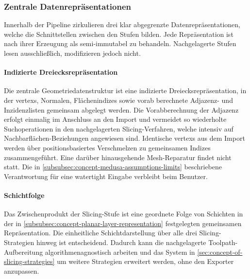            \subsubsection{Zentrale Datenrepräsentationen}\label{subsubsec:concept-medusa-data-representations} 
                Innerhalb der Pipeline zirkulieren drei klar abgegrenzte Datenrepräsentationen, welche die Schnittstellen zwischen den Stufen bilden.
                Jede Repräsentation ist nach ihrer Erzeugung als semi-immutabel zu behandeln.
                Nachgelagerte Stufen lesen ausschließlich, modifizieren jedoch nicht.

                \paragraph{Indizierte Dreiecksrepräsentation}
                    Die zentrale Geometriedatenstruktur ist eine indizierte Dreiecksrepräsentation, in der \glspl{vertex}, Normalen, Flächenindizes sowie vorab berechnete Adjazenz- und Inzidenzlisten gemeinsam abgelegt werden.
                    Die Vorabberechnung der Adjazenz erfolgt einmalig im Anschluss an den Import und vermeidet so wiederholte Suchoperationen in den nachgelagerten Slicing-Verfahren, welche intensiv auf Nachbarflächen-Beziehungen angewiesen sind.
                    Identische \glspl{vertex} aus dem Import werden über positionsbasiertes Verschmelzen zu gemeinsamen Indizes zusammengeführt.
                    Eine darüber hinausgehende Mesh-Reparatur findet nicht statt.
                    Die in \cref{subsubsec:concept-medusa-assumptions-limits} beschriebene Verantwortung für eine \gls{watertight} Eingabe verbleibt beim Benutzer.

                \paragraph{Schichtfolge}
                    Das Zwischenprodukt der Slicing-Stufe ist eine geordnete Folge von Schichten in der in \cref{subsubsec:concept-planar-layer-representation} festgelegten gemeinsamen Repräsentation.
                    Die einheitliche Schichtdarstellung über alle drei Slicing-Strategien hinweg ist entscheidend.
                    Dadurch kann die nachgelagerte Toolpath-Aufbereitung algorithmenagnostisch arbeiten und das System in \cref{sec:concept-of-slicing-strategies} um weitere Strategien erweitert werden, ohne den Exporter anzupassen.

